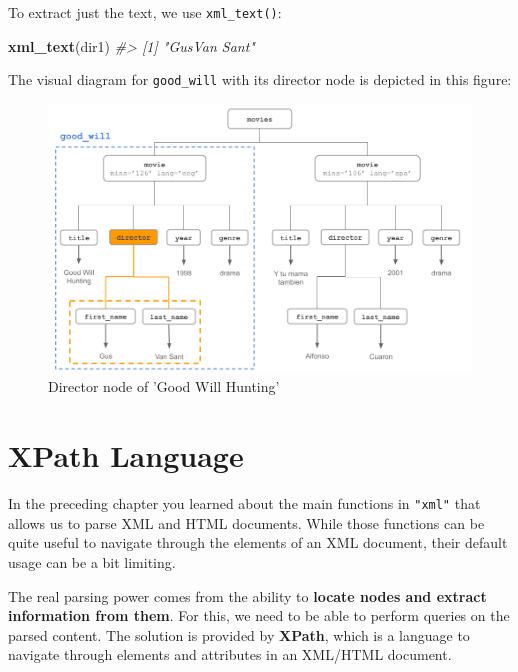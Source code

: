 \documentclass[
]{book}
\newenvironment{Shaded}{\begin{snugshade}}{\end{snugshade}}
\newcommand{\CommentTok}[1]{\textcolor[rgb]{0.56,0.35,0.01}{\textit{#1}}}
\newcommand{\FunctionTok}[1]{\textcolor[rgb]{0.13,0.29,0.53}{\textbf{#1}}}
\newcommand{\NormalTok}[1]{#1}
\begin{document}
To extract just the text, we use \texttt{xml\_text()}:

\begin{Shaded}
\begin{Highlighting}[]
\FunctionTok{xml\_text}\NormalTok{(dir1)}
\CommentTok{\#\textgreater{} [1] "GusVan Sant"}
\end{Highlighting}
\end{Shaded}

The visual diagram for \texttt{good\_will} with its director node is depicted in this
figure:

\begin{figure}

{\centering \includegraphics[width=0.85\linewidth]{images/xml/xml-movies-tree4} 

}

\caption{Director node of 'Good Will Hunting'}\label{fig:unnamed-chunk-48}
\end{figure}

\hypertarget{xpath}{%
\chapter{XPath Language}\label{xpath}}

In the preceding chapter you learned about the main functions in \texttt{"xml"} that
allows us to parse XML and HTML documents. While those functions can be quite
useful to navigate through the elements of an XML document, their default usage
can be a bit limiting.

The real parsing power comes from the ability to
\textbf{locate nodes and extract information from them}. For this, we need to be
able to perform queries on the parsed content. The solution is provided by
\textbf{XPath}, which is a language to navigate through elements and attributes in
an XML/HTML document.
\end{document}
